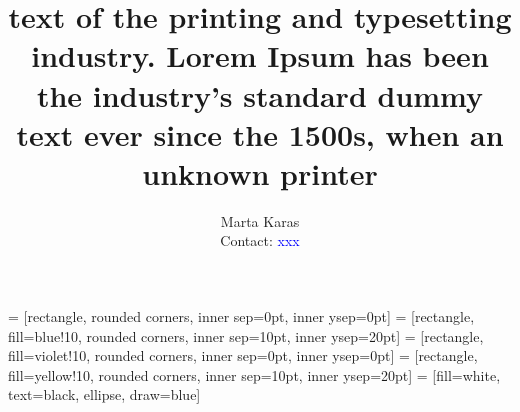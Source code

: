 \documentclass[portrait,a0,final]{a0poster}\usepackage[]{graphicx}\usepackage[]{color}
\title{\Huge text of the printing and typesetting industry. Lorem Ipsum has been the industry's standard dummy text ever since the 1500s, when an unknown printer}
\date{}
\author{{Marta Karas}\\ \Large Contact: \textcolor{blue}{xxx}}
\begin{document}
\pagestyle{empty}
\maketitle
\Large


 = [rectangle, rounded corners, inner sep=0pt, inner ysep=0pt]
 = [rectangle, fill=blue!10, rounded corners, inner sep=10pt, inner ysep=20pt]
 = [rectangle, fill=violet!10, rounded corners, inner sep=0pt, inner ysep=0pt]
 = [rectangle, fill=yellow!10, rounded corners, inner sep=10pt, inner ysep=20pt]
 = [fill=white, text=black, ellipse, draw=blue]


\vspace{0cm}
\end{document}
